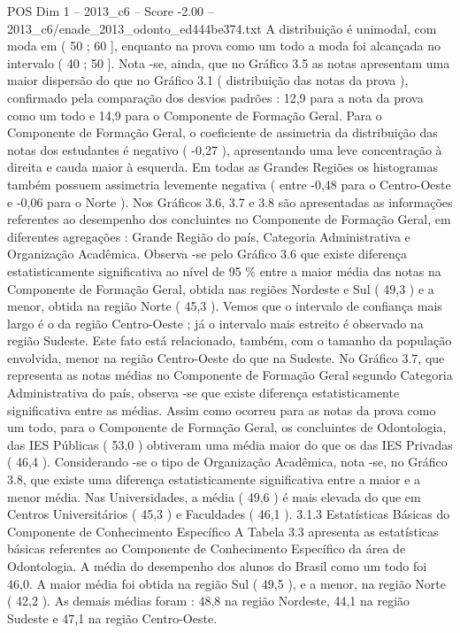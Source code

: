 \begin{textsample}{POS Dim 1 – 2013\_c6 – Score -2.00 – 2013\_c6/enade\_2013\_odonto\_ed444be374.txt}
A distribuição é unimodal, com moda em ( 50 ; 60 ], enquanto na prova como um todo a moda foi alcançada no intervalo ( 40 ; 50 ].
Nota -se, ainda, que no Gráfico 3.5 as notas apresentam uma maior dispersão do que no Gráfico 3.1 ( distribuição das notas da prova ), confirmado pela comparação dos desvios padrões : 12,9 para a nota da prova como um todo e 14,9 para o Componente de Formação Geral.
Para o Componente de Formação Geral, o coeficiente de assimetria da distribuição das notas dos estudantes é negativo ( -0,27 ), apresentando uma leve concentração à direita e cauda maior à esquerda.
Em todas as Grandes Regiões os histogramas também possuem assimetria levemente negativa ( entre -0,48 para o Centro-Oeste e -0,06 para o Norte ).
Nos Gráficos 3.6, 3.7 e 3.8 são apresentadas as informações referentes ao desempenho dos concluintes no Componente de Formação Geral, em diferentes agregações : Grande Região do país, Categoria Administrativa e Organização Acadêmica.
Observa -se pelo Gráfico 3.6 que existe diferença estatisticamente significativa ao nível de 95 \% entre a maior média das notas na Componente de Formação Geral, obtida nas regiões Nordeste e Sul ( 49,3 ) e a menor, obtida na região Norte ( 45,3 ).
Vemos que o intervalo de confiança mais largo é o da região Centro-Oeste ; já o intervalo mais estreito é observado na região Sudeste.
Este fato está relacionado, também, com o tamanho da população envolvida, menor na região Centro-Oeste do que na Sudeste.
No Gráfico 3.7, que representa as notas médias no Componente de Formação Geral segundo Categoria Administrativa do país, observa -se que existe diferença estatisticamente significativa entre as médias.
Assim como ocorreu para as notas da prova como um todo, para o Componente de Formação Geral, os concluintes de Odontologia, das IES Públicas ( 53,0 ) obtiveram uma média maior do que os das IES Privadas ( 46,4 ).
Considerando -se o tipo de Organização Acadêmica, nota -se, no Gráfico 3.8, que existe uma diferença estatisticamente significativa entre a maior e a menor média.
Nas Universidades, a média ( 49,6 ) é mais elevada do que em Centros Universitários ( 45,3 ) e Faculdades ( 46,1 ). 3.1.3 Estatísticas Básicas do Componente de Conhecimento Específico A Tabela 3.3 apresenta as estatísticas básicas referentes ao Componente de Conhecimento Específico da área de Odontologia.
A média do desempenho dos alunos do Brasil como um todo foi 46,0.
A maior média foi obtida na região Sul ( 49,5 ), e a menor, na região Norte ( 42,2 ).
As demais médias foram : 48,8 na região Nordeste, 44,1 na região Sudeste e 47,1 na região Centro-Oeste.

\end{textsample}
